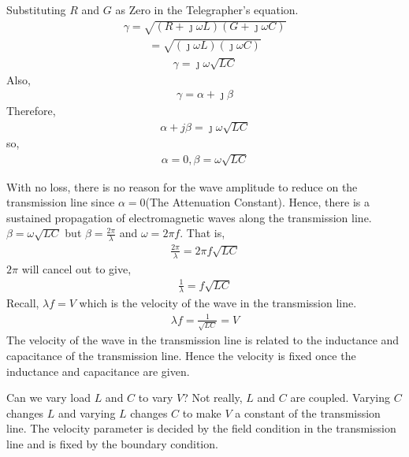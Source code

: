 Substituting $R$ and $G$ as Zero in the Telegrapher's equation.
\begin{align*}
\gamma = \sqrt{(R + \jmath\omega L)(G + \jmath\omega C)}
\end{align*}
\begin{align*}
= \sqrt{(\jmath\omega L)(\jmath\omega C)}
\end{align*}
\begin{align*}
\gamma = \jmath\omega\sqrt{LC}
\end{align*}
Also,
\begin{align*}
\gamma = \alpha + \jmath\beta
\end{align*} 
Therefore,
\begin{align*}
\alpha + j\beta = \jmath\omega\sqrt{LC}
\end{align*}
so,
\begin{align*}
\alpha = 0, \beta = \omega\sqrt{LC}
\end{align*}

With no loss, there is no reason for the wave amplitude to reduce on the transmission line since $\alpha = 0$(The Attenuation Constant). Hence, there is a sustained propagation of electromagnetic waves along the transmission line.\\
$\beta = \omega\sqrt{LC}$ but $\beta = \frac{2\pi}{\lambda}$ and $\omega = 2\pi f $. That is,
\begin{align*}
\frac{2\pi}{\lambda} = 2\pi f\sqrt{LC}
\end{align*}
$2\pi$ will cancel out to give,
\begin{align*}
\frac{1}{\lambda} =  f\sqrt{LC}
\end{align*}
Recall, $\lambda f = V$ which is the velocity of the wave in the transmission line.
\begin{align*}
\lambda f = \frac{1}{\sqrt{LC}} = V
\end{align*}
The velocity of the wave in the transmission line is related to the inductance and capacitance of the transmission line. Hence the velocity is fixed once the inductance and capacitance are given.

Can we vary load $L$ and $C$ to vary $V$? Not really, $L$ and $C$ are coupled. Varying $C$ changes $L$ and varying $L$ changes $C$ to make $V$ a constant of the transmission line. The velocity parameter is decided by the field condition in the transmission line and is fixed by the boundary condition. 

